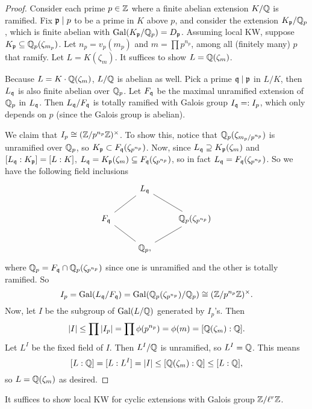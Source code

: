 \documentclass[11pt]{amsart}
\begin{document}
\begin{proof}
    Consider each prime $p\in \mathbb{Z}$ where a finite abelian extension $K/\mathbb{Q}$ is ramified. Fix $\mathfrak{p}\mid p$ to be a prime in $K$ above $p$, and consider the extension $K_{\mathfrak{p}}/\mathbb{Q}_p$, which is finite abelian with $\operatorname{Gal}(K_{\mathfrak{p}}/\mathbb{Q}_p) = D_{\mathfrak{p}}$. Assuming local KW, suppose $K_{\mathfrak{p}}\subseteq \mathbb{Q}_p(\zeta_{m_p})$. Let $n_p = v_p(m_p)$ and $m = \prod p^{n_p}$, among all (finitely many) $p$ that ramify. Let $L = K(\zeta_m)$. It suffices to show $L = \mathbb{Q}(\zeta_m)$.

    Because $L = K\cdot\mathbb{Q}(\zeta_{m})$, $L/\mathbb{Q}$ is abelian as well. Pick a prime $\mathfrak{q}\mid \mathfrak{p}$ in $L/K$, then $L_{\mathfrak{q}}$ is also finite abelian over $\mathbb{Q}_p$. Let $F_{\mathfrak{q}}$ be the maximal unramified extension of $\mathbb{Q}_p$ in $L_{\mathfrak{q}}$. Then $L_{\mathfrak{q}}/F_{\mathfrak{q}}$ is totally ramified with Galois group $I_{\mathfrak{q}} =: I_p$, which only depends on $p$ (since the Galois group is abelian).

    We claim that $I_p \cong (\mathbb{Z}/p^{n_p}\mathbb{Z})^{\times}$. To show this, notice that $\mathbb{Q}_p(\zeta_{m_p/p^{n_p}})$ is unramified over $\mathbb{Q}_p$, so $K_{\mathfrak{p}} \subset F_{\mathfrak{q}}(\zeta_{p^{n_p}})$. Now, since $L_{\mathfrak{q}}\supseteq K_{\mathfrak{p}}(\zeta_{m})$ and $[L_{\mathfrak{q}}:K_{\mathfrak{p}}] = [L:K]$, $L_{\mathfrak{q}} = K_{\mathfrak{p}}(\zeta_{m}) \subseteq F_{\mathfrak{q}}(\zeta_{p^{n_p}})$, so in fact $L_{\mathfrak{q}} = F_{\mathfrak{q}}(\zeta_{p^{n_p}})$. So we have the following field inclusions
    \[
    \begin{tikzcd}
        & L_{\fq} \arrow[ld, dash]  \arrow[rd, dash] & \\
    F_{\fq} \arrow[rd, dash] & & \QQ_p(\zeta_{p^{n_p}}) \arrow[ld, dash] \\
     & \QQ_p, &
    \end{tikzcd}
    \]
    where $\mathbb{Q}_p = F_{\mathfrak{q}}\cap \mathbb{Q}_p(\zeta_{p^{n_p}})$ since one is unramified and the other is totally ramified. So
    \[I_p = \operatorname{Gal}(L_{\mathfrak{q}}/F_{\mathfrak{q}}) = \operatorname{Gal}(\mathbb{Q}_p(\zeta_{p^{n_p}})/\mathbb{Q}_p) \cong (\mathbb{Z}/p^{n_p}\mathbb{Z})^{\times}.\]
    Now, let $I$ be the subgroup of $\operatorname{Gal}(L/\mathbb{Q})$ generated by $I_p$'s. Then
    \[|I| \le \prod |I_p| = \prod \phi(p^{n_p}) = \phi(m) = [\mathbb{Q}(\zeta_m):\mathbb{Q}].\]
    Let $L^{I}$ be the fixed field of $I$. Then $L^I/\mathbb{Q}$ is unramified, so $L^I = \mathbb{Q}$. This means 
    \[[L:\mathbb{Q}] = [L:L^I] = |I|\le [\mathbb{Q}(\zeta_m):\mathbb{Q}] \le [L:\mathbb{Q}],\] so $L = \mathbb{Q}(\zeta_m)$ as desired.
\end{proof}


\begin{prop}
    It suffices to show local KW for cyclic extensions with Galois group $\mathbb{Z}/\ell^r\mathbb{Z}$.
\end{prop}
\end{document}
